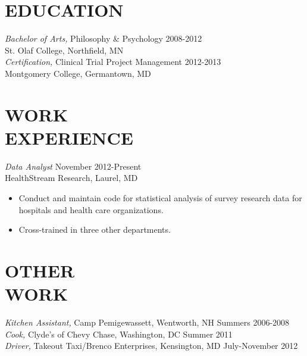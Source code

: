 \documentclass[line,margin]{res}
\begin{document}
\address{10106 Summit Avenue, Kensington, MD 20895}
\address{(240) 396-7570 | c.smith.brian@gmail.com}

 
\begin{resume}
 

 
 
\section{EDUCATION} 
		{\sl Bachelor of Arts,} Philosophy \& Psychology \hfill 2008-2012 \\ 
                St. Olaf College, Northfield, MN \\
                
                {\sl Certification,} Clinical Trial Project Management \hfill 2012-2013 \\
                Montgomery College, Germantown, MD \\
                
 \section{WORK\\EXPERIENCE}  
		{\sl Data Analyst} \hfill	November 2012-Present\\
		HealthStream Research, Laurel, MD
		\begin{itemize}
		 \item Conduct and maintain code for statistical analysis of survey research data for hospitals and health care organizations.
		 \item Cross-trained in three other departments.

		 \end{itemize}
 \section{OTHER\\WORK}
                {\sl Kitchen Assistant,} Camp Pemigewassett, Wentworth, NH  \hfill        Summers 2006-2008 \\
                {\sl Cook,} Clyde's of Chevy Chase, Washington, DC \hfill        Summer 2011 \\
		{\sl Driver,} Takeout Taxi/Brenco Enterprises, Kensington, MD  \hfill        July-November 2012 \\

\end{resume}
\end{document}
